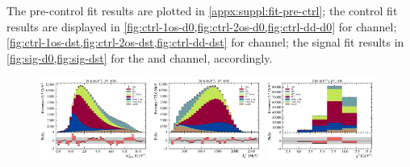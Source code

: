 The pre-control fit results are plotted in \cref{appx:suppl:fit-pre-ctrl};
the control fit results are displayed in
\cref{fig:ctrl-1os-d0,fig:ctrl-2os-d0,fig:ctrl-dd-d0} for \Dz channel;
\cref{fig:ctrl-1os-dst,fig:ctrl-2os-dst,fig:ctrl-dd-dst} for \Dstar channel;
the signal fit results in \cref{fig:sig-d0,fig:sig-dst}
for the \Dz and \Dstar channel, accordingly.


\begin{figure}[!htb]
    \centering
    \includegraphics[width=0.32\textwidth]{./figs-fit-fit-results/ctrl-fit/stacked/fit_result-stacked-D0-1os-mmiss2.pdf}
    \includegraphics[width=0.32\textwidth]{./figs-fit-fit-results/ctrl-fit/stacked/fit_result-stacked-D0-1os-el.pdf}
    \includegraphics[width=0.32\textwidth]{./figs-fit-fit-results/ctrl-fit/stacked/fit_result-stacked-D0-1os-q2.pdf}


\end{figure}
